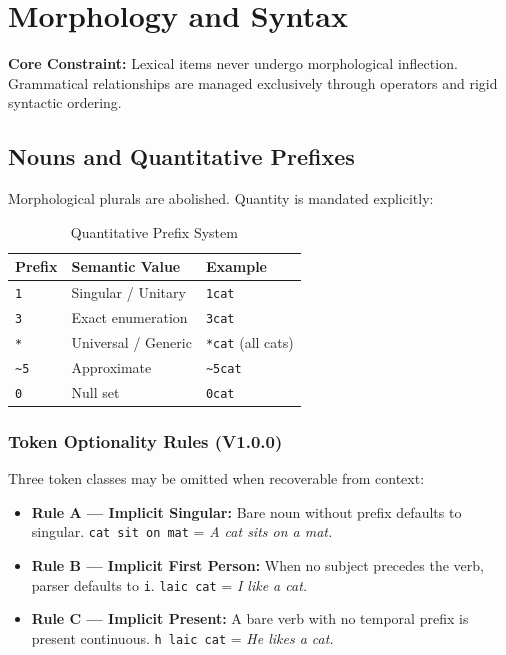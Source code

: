 \documentclass[10pt,onecolumn,letterpaper]{article}
\newcommand{\me}[1]{\texttt{#1}}
\begin{document}
\section{Morphology and Syntax}

\textbf{Core Constraint:} Lexical items never undergo morphological inflection.
Grammatical relationships are managed exclusively through operators and
rigid syntactic ordering.

\subsection{Nouns and Quantitative Prefixes}
Morphological plurals are abolished. Quantity is mandated explicitly:

\begin{table}[h!]
\centering\small
\begin{tabularx}{\linewidth}{lXl}
\toprule
\textbf{Prefix} & \textbf{Semantic Value} & \textbf{Example} \\
\midrule
\me{1}     & Singular / Unitary  & \me{1cat} \\
\me{3}     & Exact enumeration   & \me{3cat} \\
\me{*}     & Universal / Generic & \me{*cat} (all cats) \\
\me{\~{}5} & Approximate         & \me{\~{}5cat} \\
\me{0}     & Null set            & \me{0cat} \\
\bottomrule
\end{tabularx}
\caption{Quantitative Prefix System}
\end{table}

\subsubsection{Token Optionality Rules (V1.0.0)}
Three token classes may be omitted when recoverable from context:
\begin{itemize}[leftmargin=*]
    \item \textbf{Rule A --- Implicit Singular:} Bare noun without prefix defaults to singular. \me{cat sit on mat} = \textit{A cat sits on a mat.}
    \item \textbf{Rule B --- Implicit First Person:} When no subject precedes the verb, parser defaults to \me{i}. \me{laic cat} = \textit{I like a cat.}
    \item \textbf{Rule C --- Implicit Present:} A bare verb with no temporal prefix is present continuous. \me{h laic cat} = \textit{He likes a cat.}
\end{itemize}
\end{document}
